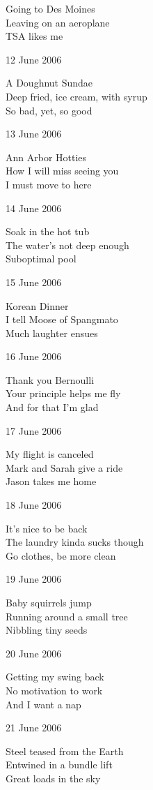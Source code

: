 \documentclass[12pt]{article}
\begin{document}
Going to Des Moines \\
Leaving on an aeroplane \\
TSA likes me

12 June 2006

A Doughnut Sundae \\
Deep fried, ice cream, with syrup \\
So bad, yet, so good

\newpage

13 June 2006

Ann Arbor Hotties \\
How I will miss seeing you \\
I must move to here

14 June 2006

Soak in the hot tub \\
The water's not deep enough \\
Suboptimal pool

15 June 2006

Korean Dinner \\
I tell Moose of Spangmato \\
Much laughter ensues

16 June 2006

Thank you Bernoulli \\
Your principle helps me fly \\
And for that I'm glad

17 June 2006

My flight is canceled \\
Mark and Sarah give a ride \\
Jason takes me home

18 June 2006

It's nice to be back \\
The laundry kinda sucks though \\
Go clothes, be more clean

\newpage

19 June 2006

Baby squirrels jump \\
Running around a small tree \\
Nibbling tiny seeds

20 June 2006

Getting my swing back \\
No motivation to work \\
And I want a nap

21 June 2006

Steel teased from the Earth \\
Entwined in a bundle lift \\
Great loads in the sky
\end{document}
